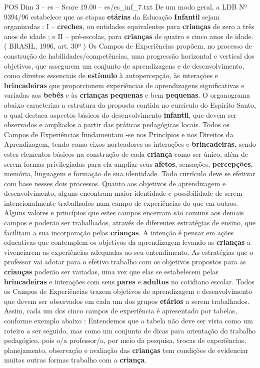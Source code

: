 \begin{textsample}{POS Dim 3 – es – Score 19.00 – es/es\_inf\_7.txt}
De um modo geral, a LDB Nº 9394/96 estabelece que as etapas \textbf{etárias} da Educação \textbf{Infantil} sejam organizadas : I – \textbf{creches}, ou entidades equivalentes para \textbf{crianças} de zero a três anos de idade ; e II – pré-escolas, para \textbf{crianças} de quatro e cinco anos de idade. ( BRASIL, 1996, art. 30º ) Os Campos de Experiências propõem, no processo de construção de habilidades/competências, uma progressão horizontal e vertical dos objetivos, que assegurem um conjunto de aprendizagens e de desenvolvimento, como direitos essenciais de \textbf{estímulo} à autopercepção, às interações e \textbf{brincadeiras} que proporcionem experiências de aprendizagens significativas e variadas aos \textbf{bebês} e às \textbf{crianças} \textbf{pequenas} e bem \textbf{pequenas}.
O organograma abaixo caracteriza a estrutura da proposta contida no currículo do Espírito Santo, a qual destaca aspectos básicos do desenvolvimento \textbf{infantil}, que devem ser observados e ampliados a partir das práticas pedagógicas locais.
Todos os Campos de Experiências fundamentam -se nos Princípios e nos Direitos da Aprendizagem, tendo como eixos norteadores as interações e \textbf{brincadeiras}, sendo estes elementos básicos na construção de cada \textbf{criança} como ser único, além de serem formas privilegiadas para ela ampliar seus \textbf{afetos}, sensações, \textbf{percepções}, memória, linguagem e formação de sua identidade.
Todo currículo deve se efetivar com base nesses dois processos.
Quanto aos objetivos de aprendizagem e desenvolvimento, alguns encontram maior identidade e possibilidade de serem intencionalmente trabalhados num campo de experiências do que em outros.
Alguns valores e princípios que estes campos encerram são comuns aos demais campos e poderão ser trabalhados, através de diferentes estratégias de ensino, que facilitam a sua incorporação pelas \textbf{crianças}.
A intenção é pensar em ações educativas que contemplem os objetivos da aprendizagem levando as \textbf{crianças} a vivenciarem as experiências adequadas ao seu entendimento.
As estratégias que o professor vai adotar para o efetivo trabalho com os objetivos propostos para as \textbf{crianças} poderão ser variadas, uma vez que elas se estabelecem pelas \textbf{brincadeiras} e interações com seus \textbf{pares} e \textbf{adultos} no cotidiano escolar.
Todos os Campos de Experiências trazem objetivos de aprendizagem e desenvolvimento que devem ser observados em cada um dos grupos \textbf{etários} a serem trabalhados.
Assim, cada um dos cinco campos de experiência é apresentado por tabelas, conforme exemplo abaixo : Entendemos que a tabela não deve ser vista como um roteiro a ser seguido, mas como um conjunto de dicas para orientação do trabalho pedagógico, pois o/a professor/a, por meio da pesquisa, trocas de experiências, planejamento, observação e avaliação das \textbf{crianças} tem condições de evidenciar muitas outras formas trabalho com a \textbf{criança}.

\end{textsample}
